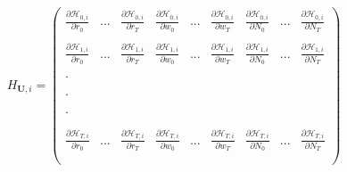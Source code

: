 \documentclass[titlepage]{\econtex}\providecommand{\texname}{FBS-NK}
\begin{document}
 
 $$ H_{\mathbf{U}, i}= \begin{pmatrix} 
\frac{ \partial \mathcal{H}_{0,i}}{\partial r_{0}}  & ... & \frac{ \partial \mathcal{H}_{0,i}}{\partial r_{T}} & \frac{ \partial \mathcal{H}_{0,i}}{\partial w_{0}} & ... & \frac{ \partial \mathcal{H}_{0,i}}{\partial w_{T}} & \frac{ \partial \mathcal{H}_{0,i}}{\partial N_{0}} & ... &\frac{ \partial \mathcal{H}_{0,i}}{\partial N_{T}} \\ \\ 
\frac{ \partial \mathcal{H}_{1,i}}{\partial r_{0}}  & ... & \frac{ \partial \mathcal{H}_{1,i}}{\partial r_{T}} & \frac{ \partial \mathcal{H}_{1,i}}{\partial w_{0}} & ... & \frac{ \partial \mathcal{H}_{1,i}}{\partial w_{T}} & \frac{ \partial \mathcal{H}_{1,i}}{\partial N_{0}} & ... &\frac{ \partial \mathcal{H}_{1,i}}{\partial N_{T}}  \\ \\
.   \\ \\ \\ 
. \\ \\ \\
. \\ \\ \\
\frac{ \partial \mathcal{H}_{T,i}}{\partial r_{0}}  & ... & \frac{ \partial \mathcal{H}_{T,i}}{\partial r_{T}} & \frac{ \partial \mathcal{H}_{T,i}}{\partial w_{0}} & ... & \frac{ \partial \mathcal{H}_{T,i}}{\partial w_{T}} & \frac{ \partial \mathcal{H}_{T,i}}{\partial N_{0}} & ... &\frac{ \partial \mathcal{H}_{T,i}}{\partial N_{T}} \\ \\
 \end{pmatrix} $$ \\
 
\end{document}
